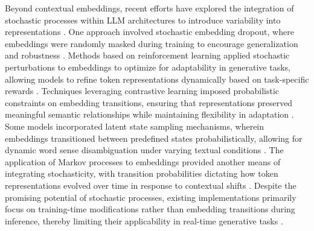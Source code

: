 Beyond contextual embeddings, recent efforts have explored the integration of stochastic processes within LLM architectures to introduce variability into representations \cite{novado2024multi}. One approach involved stochastic embedding dropout, where embeddings were randomly masked during training to encourage generalization and robustness \cite{meibuki2024improving}. Methods based on reinforcement learning applied stochastic perturbations to embeddings to optimize for adaptability in generative tasks, allowing models to refine token representations dynamically based on task-specific rewards \cite{ sawhai2024token}. Techniques leveraging contrastive learning imposed probabilistic constraints on embedding transitions, ensuring that representations preserved meaningful semantic relationships while maintaining flexibility in adaptation \cite{grayson2024mitigating}. Some models incorporated latent state sampling mechanisms, wherein embeddings transitioned between predefined states probabilistically, allowing for dynamic word sense disambiguation under varying textual conditions \cite{ping2024measuring}. The application of Markov processes to embeddings provided another means of integrating stochasticity, with transition probabilities dictating how token representations evolved over time in response to contextual shifts \cite{li2024evaluating, shao2024automated}. Despite the promising potential of stochastic processes, existing implementations primarily focus on training-time modifications rather than embedding transitions during inference, thereby limiting their applicability in real-time generative tasks \cite{roberts2024extending}.